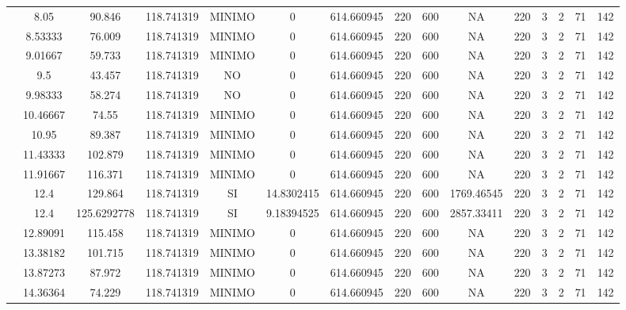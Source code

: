 \begin{table}[H]
{\begin{tabular}{|c|c|c|c|c|c|c|c|c|c|c|c|c|c|c|}
\cline{2-15}    & 8.05 & 90.846 & 118.741319 & MINIMO & 0   & 614.660945 & 220 & 600 & NA  & 220 & 3   & 2   & 71  & 142 \bigstrut\\
\cline{2-15}    & 8.53333 & 76.009 & 118.741319 & MINIMO & 0   & 614.660945 & 220 & 600 & NA  & 220 & 3   & 2   & 71  & 142 \bigstrut\\
\cline{2-15}    & 9.01667 & 59.733 & 118.741319 & MINIMO & 0   & 614.660945 & 220 & 600 & NA  & 220 & 3   & 2   & 71  & 142 \bigstrut\\
\cline{2-15}    & 9.5 & 43.457 & 118.741319 & NO  & 0   & 614.660945 & 220 & 600 & NA  & 220 & 3   & 2   & 71  & 142 \bigstrut\\
\cline{2-15}    & 9.98333 & 58.274 & 118.741319 & NO  & 0   & 614.660945 & 220 & 600 & NA  & 220 & 3   & 2   & 71  & 142 \bigstrut\\
\cline{2-15}    & 10.46667 & 74.55 & 118.741319 & MINIMO & 0   & 614.660945 & 220 & 600 & NA  & 220 & 3   & 2   & 71  & 142 \bigstrut\\
\cline{2-15}    & 10.95 & 89.387 & 118.741319 & MINIMO & 0   & 614.660945 & 220 & 600 & NA  & 220 & 3   & 2   & 71  & 142 \bigstrut\\
\cline{2-15}    & 11.43333 & 102.879 & 118.741319 & MINIMO & 0   & 614.660945 & 220 & 600 & NA  & 220 & 3   & 2   & 71  & 142 \bigstrut\\
\cline{2-15}    & 11.91667 & 116.371 & 118.741319 & MINIMO & 0   & 614.660945 & 220 & 600 & NA  & 220 & 3   & 2   & 71  & 142 \bigstrut\\
\cline{2-15}    & 12.4 & 129.864 & 118.741319 & SI  & 14.8302415 & 614.660945 & 220 & 600 & 1769.46545 & 220 & 3   & 2   & 71  & 142 \bigstrut\\
\cline{2-15}    & 12.4 & 125.6292778 & 118.741319 & SI  & 9.18394525 & 614.660945 & 220 & 600 & 2857.33411 & 220 & 3   & 2   & 71  & 142 \bigstrut\\
\cline{2-15}    & 12.89091 & 115.458 & 118.741319 & MINIMO & 0   & 614.660945 & 220 & 600 & NA  & 220 & 3   & 2   & 71  & 142 \bigstrut\\
\cline{2-15}    & 13.38182 & 101.715 & 118.741319 & MINIMO & 0   & 614.660945 & 220 & 600 & NA  & 220 & 3   & 2   & 71  & 142 \bigstrut\\
\cline{2-15}    & 13.87273 & 87.972 & 118.741319 & MINIMO & 0   & 614.660945 & 220 & 600 & NA  & 220 & 3   & 2   & 71  & 142 \bigstrut\\
\cline{2-15}    & 14.36364 & 74.229 & 118.741319 & MINIMO & 0   & 614.660945 & 220 & 600 & NA  & 220 & 3   & 2   & 71  & 142 \bigstrut\\

\end{tabular}}
\end{table}
